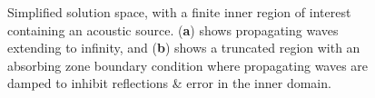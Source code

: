 \begin{figure}[h]
    \centering
    \begin{subfigure}[h]{0.47\textwidth}
        \centering
        \caption{}
        \label{fig:UnboundedDomain}
    \end{subfigure}
    \hfill
    \begin{subfigure}[h]{0.47\textwidth}
        \centering
        \caption{}
        \label{fig:TruncatedDomain}
    \end{subfigure}
    \caption{Simplified solution space, with a finite inner region of interest containing an acoustic source. (\textbf{a}) shows propagating waves extending to infinity, and (\textbf{b}) shows a truncated region with an absorbing zone boundary condition where propagating waves are damped to inhibit reflections \& error in the inner domain.}
    \label{fig:Domain}
\end{figure}


